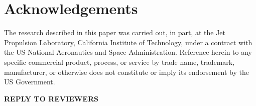 \documentclass[smallcondesed]{svjour3}
\begin{document}


  
\section*{Acknowledgements}
 The research described in this paper was carried out, in part, at the Jet
 Propulsion Laboratory, California Institute of Technology,
 under a contract with the US National Aeronautics and
 Space Administration. Reference herein to any specific
 commercial product, process, or service by trade name,
 trademark, manufacturer, or otherwise does not constitute
or imply its endorsement by the US Government.



\vspace*{0.5mm} 




\balance
\newpage
\setcounter{page}{1}
\noindent
    {\bf REPLY TO REVIEWERS}

 

\end{document}
